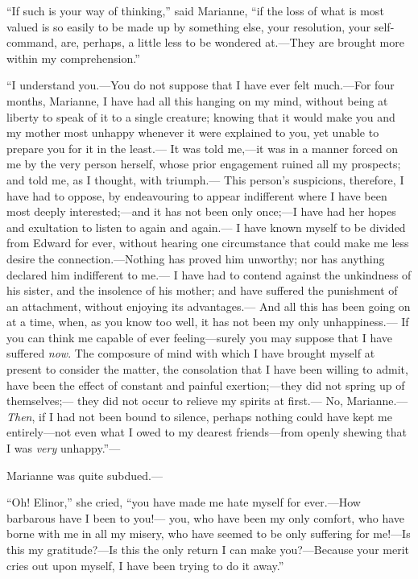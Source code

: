 \documentclass{article}
\begin{document}
``If such is your way of thinking,'' said Marianne,
``if the loss of what is most valued is so easily
to be made up by something else, your resolution,
your self-command, are, perhaps, a little less to be
wondered at.---They are brought more within my comprehension.''

``I understand you.---You do not suppose that I have ever
felt much.---For four months, Marianne, I have had all this
hanging on my mind, without being at liberty to speak
of it to a single creature; knowing that it would make
you and my mother most unhappy whenever it were explained
to you, yet unable to prepare you for it in the least.---%
It was told me,---it was in a manner forced on me by the
very person herself, whose prior engagement ruined all
my prospects; and told me, as I thought, with triumph.---%
This person's suspicions, therefore, I have had to oppose,
by endeavouring to appear indifferent where I have been most
deeply interested;---and it has not been only once;---I have
had her hopes and exultation to listen to again and again.---%
I have known myself to be divided from Edward for ever,
without hearing one circumstance that could make me less
desire the connection.---Nothing has proved him unworthy;
nor has anything declared him indifferent to me.---%
I have had to contend against the unkindness of his sister,
and the insolence of his mother; and have suffered the
punishment of an attachment, without enjoying its advantages.---%
And all this has been going on at a time, when, as you
know too well, it has not been my only unhappiness.---%
If you can think me capable of ever feeling---surely you
may suppose that I have suffered \emph{now}.  The composure
of mind with which I have brought myself at present
to consider the matter, the consolation that I have been
willing to admit, have been the effect of constant and
painful exertion;---they did not spring up of themselves;---%
they did not occur to relieve my spirits at first.---%
No, Marianne.---\emph{Then}, if I had not been bound to silence,
perhaps nothing could have kept me entirely---not even what I
owed to my dearest friends---from openly shewing that I was
\emph{very} unhappy.''---%

Marianne was quite subdued.---%

``Oh! Elinor,'' she cried, ``you have made me hate
myself for ever.---How barbarous have I been to you!---%
you, who have been my only comfort, who have borne with me
in all my misery, who have seemed to be only suffering
for me!---Is this my gratitude?---Is this the only return I
can make you?---Because your merit cries out upon myself,
I have been trying to do it away.''
\end{document}
